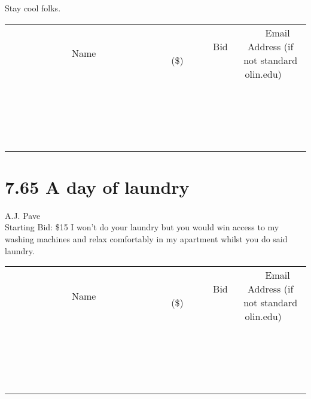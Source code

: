 \documentclass[11pt]{article}
\begin{document}
Stay cool folks.
\\[3ex]
\begin{tabular}{c c c}
~~~~~~~~~~~~~Name~~~~~~~~~~~~~ & ~~~~~~~~~Bid (\$)~~~~~~~~~  & ~~~Email Address (if not standard olin.edu)~~~\\
 & & \\
\hline
 & & \\
\hline
 & & \\
\hline
 & & \\
\hline
 & & \\
\hline
 & & \\
\hline
 & & \\
\hline
 & & \\
\hline
 & & \\
\hline
 & & \\
\hline
 & & \\
\hline
 & & \\
\hline
 & & \\
\hline
 & & \\
\hline
 & & \\
\hline
 & & \\
\hline
 & & \\
\hline
 & & \\
\hline
 & & \\
\hline
\end{tabular}
\newpage
\section*{7.65 A day of laundry}
A.J. Pave
\\
Starting Bid: \$15
\newline
I won't do your laundry but you would win access to my washing machines and relax comfortably in my apartment whilst you do said laundry.
\\[3ex]
\begin{tabular}{c c c}
~~~~~~~~~~~~~Name~~~~~~~~~~~~~ & ~~~~~~~~~Bid (\$)~~~~~~~~~  & ~~~Email Address (if not standard olin.edu)~~~\\
 & & \\
\hline
 & & \\
\hline
 & & \\
\hline
 & & \\
\hline
 & & \\
\hline
 & & \\
\hline
 & & \\
\hline
 & & \\
\hline
 & & \\
\hline
 & & \\
\hline
 & & \\
\hline
 & & \\
\hline
 & & \\
\hline
 & & \\
\hline
 & & \\
\hline
 & & \\
\hline
 & & \\
\hline
 & & \\
\hline
 & & \\
\hline
\end{tabular}
\newpage
\end{document}
